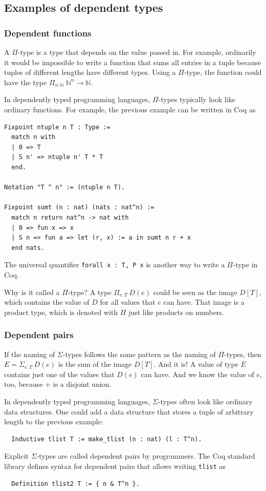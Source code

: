 \documentclass[english, 12pt, a4paper, sci, a-1b, online]{aaltothesis}
\newcommand\icoq[1]{\texttt{#1}}
\begin{document}
\subsection{Examples of dependent types}
\subsubsection{Dependent functions}

A $\Pi$-type is a type that depends on the value passed in. For example, ordinarily it would be impossible to write a function that sums all entries in a tuple because tuples of different lengths have different types. Using a $\Pi$-type, the function could have the type $\Pi_{n : \mathbb N}~\mathbb N^n \to \mathbb N$.

In dependently typed programming languages, $\Pi$-types typically look like ordinary functions. For example, the previous example can be written in Coq as
\begin{verbatim}
Fixpoint ntuple n T : Type :=
  match n with
  | 0 => T
  | S n' => ntuple n' T * T
  end.

Notation "T ^ n" := (ntuple n T).

Fixpoint sumt (n : nat) (nats : nat^n) :=
  match n return nat^n -> nat with
  | 0 => fun x => x
  | S n => fun a => let (r, x) := a in sumt n r + x
  end nats.
\end{verbatim}

The universal quantifier \icoq{forall x : T, P x} is another way to write a $\Pi$-type in Coq.

Why is it called a $\Pi$-type? A type $\Pi_{e:T}~D(e)$ could be seen as the image $D[T]$, which contains the value of $D$ for all values that $e$ can have. That image is a product type, which is denoted with $\Pi$ just like products on numbers.

\subsubsection{Dependent pairs}

If the naming of $\Sigma$-types follows the same pattern as the naming of $\Pi$-types, then $E = \Sigma_{e:T}~D(e)$ is the sum of the image $D[T]$. And it is! A value of type $E$ contains just one of the values that $D(e)$ can have. And we know the value of $e$, too, because $+$ is a disjoint union.

In dependently typed programming languages, $\Sigma$-types often look like ordinary data structures. One could add a data structure that stores a tuple of arbitrary length to the previous example:
\begin{verbatim}
  Inductive tlist T := make_tlist (n : nat) (l : T^n).
\end{verbatim}
Explicit $\Sigma$-types are called dependent pairs by programmers. The Coq standard library defines syntax for dependent pairs that allows writing \icoq{tlist} as
\begin{verbatim}
  Definition tlist2 T := { n & T^n }.
\end{verbatim}
\end{document}
